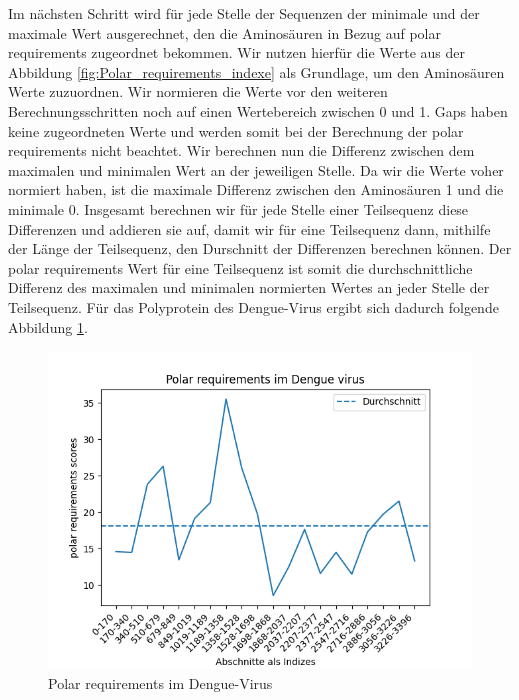 \documentclass[german,version-2022-01]{uzl-thesis}
\begin{document}
Im n\"achsten Schritt wird f\"ur jede Stelle der Sequenzen der minimale und der maximale Wert ausgerechnet, den die Aminos\"auren in Bezug auf polar requirements zugeordnet bekommen. Wir nutzen hierf\"ur die Werte aus der Abbildung \ref{fig:Polar_requirements_indexe} als Grundlage, um den Aminos\"auren Werte zuzuordnen. Wir normieren die Werte vor den weiteren Berechnungsschritten noch auf einen Wertebereich zwischen 0 und 1. Gaps haben keine zugeordneten Werte und werden somit bei der Berechnung der polar requirements nicht beachtet. Wir berechnen nun die Differenz zwischen dem maximalen und minimalen Wert an der jeweiligen Stelle. Da wir die Werte voher normiert haben, ist die maximale Differenz zwischen den Aminos\"auren 1 und die minimale 0. Insgesamt berechnen wir f\"ur jede Stelle einer Teilsequenz diese Differenzen und addieren sie auf, damit wir f\"ur eine Teilsequenz dann, mithilfe der L\"ange der Teilsequenz, den Durschnitt der Differenzen berechnen k\"onnen. Der polar requirements Wert f\"ur eine Teilsequenz ist somit die durchschnittliche Differenz des maximalen und minimalen normierten Wertes an jeder Stelle der Teilsequenz. F\"ur das Polyprotein des Dengue-Virus ergibt sich dadurch folgende Abbildung \ref{fig:Dengue_virus_polar_requirements}. 
\begin{figure}[htpb]
  \centering
  \includegraphics[scale=0.75]{Images/Diagramm_Polar_requirements_im_Dengue_virus.png}
  \caption{Polar requirements im Dengue-Virus}
  \label{fig:Dengue_virus_polar_requirements}
\end{figure}
\end{document}
